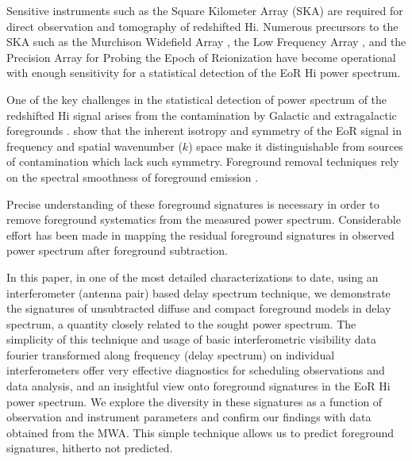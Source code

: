 \documentclass[preprint2,iop,numberedappendix]{emulateapj}
\begin{document}
Sensitive instruments such as the Square Kilometer Array (SKA) are required for direct observation and tomography of redshifted H{\sc i}. Numerous precursors to the SKA such as the Murchison Widefield Array \citep[MWA;][]{lon09,tin13}, the Low Frequency Array \citep[LOFAR;][]{van13}, and the Precision Array for Probing the Epoch of Reionization \citep[PAPER;][]{par10} have become operational with enough sensitivity for a statistical detection of the EoR H{\sc i} power spectrum. 

One of the key challenges in the statistical detection of power spectrum of the redshifted H{\sc i} signal arises from the contamination by Galactic and extragalactic foregrounds \citep[see, e.g.,][]{dim02,zal04,fur06}. \citet{mor04} show that the inherent isotropy and symmetry of the EoR signal in frequency and spatial wavenumber ($k$) space make it distinguishable from sources of contamination which lack such symmetry. Foreground removal techniques rely on the spectral smoothness of foreground emission \citep{mor06,bow09,liu11,par12,dil13}.

Precise understanding of these foreground signatures is necessary in order to remove foreground systematics from the measured power spectrum. Considerable effort has been made in mapping the residual foreground signatures in observed power spectrum \citep{thy13,pob13,mor12,tro12,dat10,bow09} after foreground subtraction. 

In this paper, in one of the most detailed characterizations to date, using an interferometer (antenna pair) based delay spectrum technique, we demonstrate the signatures of unsubtracted diffuse and compact foreground models in delay spectrum, a quantity closely related to the sought power spectrum. The simplicity of this technique and usage of basic interferometric visibility data fourier transformed along frequency (delay spectrum) on individual interferometers offer very effective diagnostics for scheduling observations and data analysis, and an insightful view onto foreground signatures in the EoR H{\sc i} power spectrum. We explore the diversity in these signatures as a function of observation and instrument parameters and confirm our findings with data obtained from the MWA. This simple technique allows us to predict foreground signatures, hitherto not predicted. 
\end{document}
